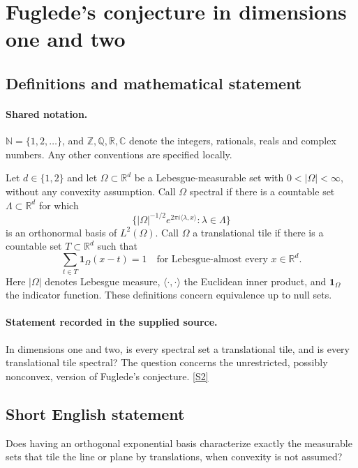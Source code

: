 \documentclass[11pt]{article}
\newcommand{\sref}[2]{\hyperlink{source:#1:#2}{[S#2]}}
\begin{document}
\section{Fuglede's conjecture in dimensions one and two}\label{statement}

\subsection{Definitions and mathematical statement}

\paragraph{Shared notation.}$\mathbb N=\{1,2,\ldots\}$, and $\mathbb Z,\mathbb Q,\mathbb R,\mathbb C$ denote the integers, rationals, reals and complex numbers. Any other conventions are specified locally.


Let \(d\in\{1,2\}\) and let \(\Omega\subset\mathbb R^d\) be a Lebesgue-measurable set with \(0<|\Omega|<\infty\), without any convexity assumption. Call \(\Omega\) spectral if there is a countable set \(\Lambda\subset\mathbb R^d\) for which
\[
 \bigl\{|\Omega|^{-1/2}e^{2\pi i\langle\lambda,x\rangle}:\lambda\in\Lambda\bigr\}
\]
is an orthonormal basis of \(L^2(\Omega)\). Call \(\Omega\) a translational tile if there is a countable set \(T\subset\mathbb R^d\) such that
\[\sum_{t\in T}\mathbf1_\Omega(x-t)=1\quad\text{for Lebesgue-almost every }x\in\mathbb R^d.\]
Here \(|\Omega|\) denotes Lebesgue measure, \(\langle\cdot,\cdot\rangle\) the Euclidean inner product, and \(\mathbf1_\Omega\) the indicator function. These definitions concern equivalence up to null sets.
\paragraph{Statement recorded in the supplied source.}
In dimensions one and two, is every spectral set a translational tile, and is every translational tile spectral? The question concerns the unrestricted, possibly nonconvex, version of Fuglede's conjecture. \sref{statement}{2}
\subsection{Short English statement}
Does having an orthogonal exponential basis characterize exactly the measurable sets that tile the line or plane by translations, when convexity is not assumed?
\end{document}
